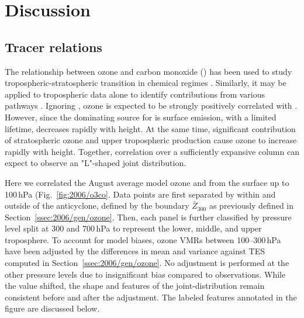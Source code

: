 \ifpdf
    \graphicspath{{Chapter_2006/figures/PNG/}{Chapter_2006/figures/PDF/}{Chapter_2006/figures/}}
\else
    \graphicspath{{Chapter_2006/figures/EPS/}{Chapter_2006/figures/}}
\fi

\section{Discussion}\label{sec:2006/discussion}

\subsection{Tracer relations}\label{ssec:2006/discuss/tracer}

The relationship between ozone and carbon monoxide () has been used to study tropospheric-stratospheric transition in
chemical regimes \citep[e.g.][and references therein]{Pan:2007sw,Hegglin:2009fk}. Similarly, it may be applied to tropospheric data
alone to identify contributions from various pathways \citep[e.g.][]{Zhang:2006zr,Voulgarakis:2011fk,Cristofanelli:2013uq}. Ignoring
, ozone is expected to be strongly positively correlated with  \citep{Chin:1994kx}. However, since the dominating
source for  is surface emission, with a limited lifetime,  decreases rapidly with height. At the same time, significant
contribution of stratospheric ozone and upper tropospheric production cause ozone to increase rapidly with height. Together, 
correlation over a sufficiently expansive column can expect to observe an "L"-shaped joint distribution.


Here we correlated the August average model ozone and  from the surface up to 100\,\unit{hPa} (Fig.~\ref{fig:2006/o3co}.
Data points are first separated by within and outside of the anticyclone, defined by the boundary $\bar{Z}_{300}$ as previously
defined in Section~\ref{ssec:2006/gen/ozone}. Then, each panel is further classified by pressure level split at 300 and 700\,\unit{hPa}
to represent the lower, middle, and upper troposphere. To account for model biases, ozone VMRs between 100--300\,\unit{hPa}
have been adjusted by the differences in mean and variance against TES computed in Section~\ref{ssec:2006/gen/ozone}. No
adjustment is performed at the other pressure levels due to insignificant bias compared to observations. While the value shifted,
the shape and features of the joint-distribution remain consistent before and after the adjustment. The labeled features annotated
in the figure are discussed below.

